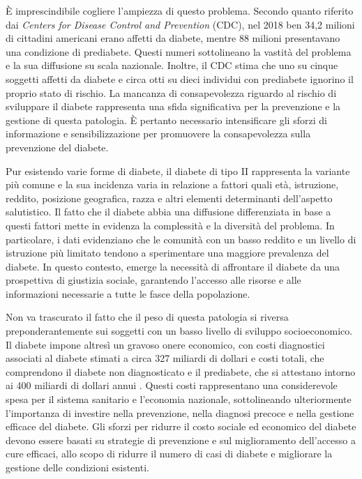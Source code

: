 È imprescindibile cogliere l'ampiezza di questo problema.
Secondo quanto riferito dai \textit{Centers for Disease Control and Prevention} (CDC), nel 2018 ben 34,2 milioni di cittadini americani erano affetti da diabete, mentre 88 milioni presentavano una condizione di prediabete.
Questi numeri sottolineano la vastità del problema e la sua diffusione su scala nazionale.
Inoltre, il CDC stima che uno su cinque soggetti affetti da diabete e circa otti su dieci individui con prediabete ignorino il proprio stato di rischio.
La mancanza di consapevolezza riguardo al rischio di sviluppare il diabete rappresenta una sfida significativa per la prevenzione e la gestione di questa patologia.
È pertanto necessario intensificare gli sforzi di informazione e sensibilizzazione per promuovere la consapevolezza sulla prevenzione del diabete.

Pur esistendo varie forme di diabete, il diabete di tipo II rappresenta la variante più comune e la sua incidenza varia in relazione a fattori quali età, istruzione, reddito, posizione geografica, razza e altri elementi determinanti dell'aspetto salutistico.
Il fatto che il diabete abbia una diffusione differenziata in base a questi fattori mette in evidenza la complessità e la diversità del problema.
In particolare, i dati evidenziano che le comunità con un basso reddito e un livello di istruzione più limitato tendono a sperimentare una maggiore prevalenza del diabete.
In questo contesto, emerge la necessità di affrontare il diabete da una prospettiva di giustizia sociale, garantendo l'accesso alle risorse e alle informazioni necessarie a tutte le fasce della popolazione.

Non va trascurato il fatto che il peso di questa patologia si riversa preponderantemente sui soggetti con un basso livello di sviluppo socioeconomico.
Il diabete impone altresì un gravoso onere economico, con costi diagnostici associati al diabete stimati a circa 327 miliardi di dollari e costi totali, che comprendono il diabete non diagnosticato e il prediabete, che si attestano intorno ai 400 miliardi di dollari annui \cite{diabetesEconomics}.
Questi costi rappresentano una considerevole spesa per il sistema sanitario e l'economia nazionale, sottolineando ulteriormente l'importanza di investire nella prevenzione, nella diagnosi precoce e nella gestione efficace del diabete.
Gli sforzi per ridurre il costo sociale ed economico del diabete devono essere basati su strategie di prevenzione e sul miglioramento dell'accesso a cure efficaci, allo scopo di ridurre il numero di casi di diabete e migliorare la gestione delle condizioni esistenti.

